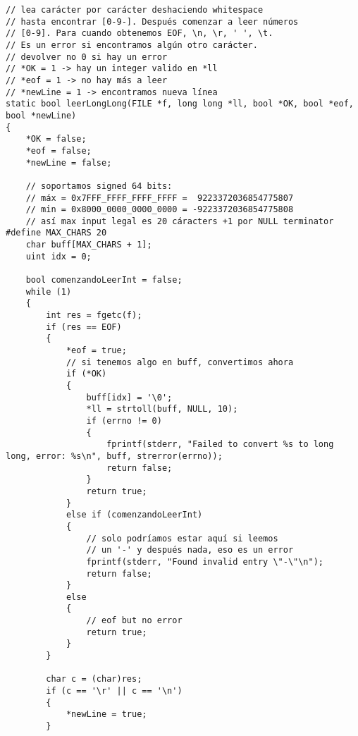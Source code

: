 \documentclass[a4paper]{article}
\begin{document}
\begin{verbatim}
// lea carácter por carácter deshaciendo whitespace
// hasta encontrar [0-9-]. Después comenzar a leer números
// [0-9]. Para cuando obtenemos EOF, \n, \r, ' ', \t.
// Es un error si encontramos algún otro carácter.
// devolver no 0 si hay un error
// *OK = 1 -> hay un integer valido en *ll
// *eof = 1 -> no hay más a leer
// *newLine = 1 -> encontramos nueva línea
static bool leerLongLong(FILE *f, long long *ll, bool *OK, bool *eof, bool *newLine)
{
    *OK = false;
    *eof = false;
    *newLine = false;

    // soportamos signed 64 bits:
    // máx = 0x7FFF_FFFF_FFFF_FFFF =  9223372036854775807
    // min = 0x8000_0000_0000_0000 = -9223372036854775808
    // así max input legal es 20 cáracters +1 por NULL terminator
#define MAX_CHARS 20
    char buff[MAX_CHARS + 1];
    uint idx = 0;

    bool comenzandoLeerInt = false;
    while (1)
    {
        int res = fgetc(f);
        if (res == EOF)
        {
            *eof = true;
            // si tenemos algo en buff, convertimos ahora
            if (*OK)
            {
                buff[idx] = '\0';
                *ll = strtoll(buff, NULL, 10);
                if (errno != 0)
                {
                    fprintf(stderr, "Failed to convert %s to long long, error: %s\n", buff, strerror(errno));
                    return false;
                }
                return true;
            }
            else if (comenzandoLeerInt)
            {
                // solo podríamos estar aquí si leemos
                // un '-' y después nada, eso es un error
                fprintf(stderr, "Found invalid entry \"-\"\n");
                return false;
            }
            else
            {
                // eof but no error
                return true;
            }
        }

        char c = (char)res;
        if (c == '\r' || c == '\n')
        {
            *newLine = true;
        }


\end{verbatim}
\end{document}
